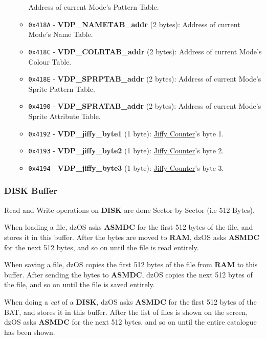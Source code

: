 \documentclass[a4paper,11pt]{article}
\begin{document}
\begin{itemize}
\begin{itemize}
            Address of current Mode’s Pattern Table.
            \item \texttt{0x418A} - \textbf{VDP\_NAMETAB\_addr} (2 bytes):
            Address of current Mode’s Name Table.
            \item \texttt{0x418C} - \textbf{VDP\_COLRTAB\_addr} (2 bytes):
            Address of current Mode’s Colour Table.
            \item \texttt{0x418E} - \textbf{VDP\_SPRPTAB\_addr} (2 bytes):
            Address of current Mode’s Sprite Pattern Table.
            \item \texttt{0x4190} - \textbf{VDP\_SPRATAB\_addr} (2 bytes):
            Address of current Mode’s Sprite Attribute Table.
            \item \texttt{0x4192} - \textbf{VDP\_jiffy\_byte1} (1 byte):
            \hyperref[subsec:jiffy_counter]{Jiffy Counter}'s byte 1.
            \item \texttt{0x4193} - \textbf{VDP\_jiffy\_byte2} (1 byte):
            \hyperref[subsec:jiffy_counter]{Jiffy Counter}'s byte 2.
            \item \texttt{0x4194} - \textbf{VDP\_jiffy\_byte3} (1 byte):
            \hyperref[subsec:jiffy_counter]{Jiffy Counter}'s byte 3.
        \end{itemize}
    \end{itemize}

    \subsubsection{DISK Buffer}

    Read and Write operations on \textbf{DISK} are done Sector by Sector (i.e 
    512 Bytes).

    When loading a file, dzOS asks \textbf{ASMDC} for the first 512 bytes of the
    file, and stores it in this buffer. After the bytes are moved to
    \textbf{RAM}, dzOS asks \textbf{ASMDC} for the next 512 bytes, and so on
    until the file is read entirely.

    When saving a file, dzOS copies the first 512 bytes of the file from
    \textbf{RAM} to this buffer. After sending the bytes to \textbf{ASMDC}, dzOS
    copies the next 512 bytes of the file, and so on until the file is saved
    entirely.

    When doing a \textit{cat} of a \textbf{DISK}, dzOS asks \textbf{ASMDC} for
    the first 512 bytes of the BAT, and stores it in this buffer. After the list
    of files is shown on the screen, dzOS asks \textbf{ASMDC} for the next 512
    bytes, and so on until the entire catalogue has been shown.
\end{document}
